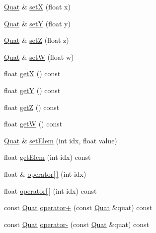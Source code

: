 \begin{DoxyCompactItemize}
\item 
\hyperlink{classVectormath_1_1Aos_1_1Quat}{Quat} \& \hyperlink{classVectormath_1_1Aos_1_1Quat_aaf8b9f42391c700a3fb3f3fc7a4279dd}{set\-X} (float x)
\item 
\hyperlink{classVectormath_1_1Aos_1_1Quat}{Quat} \& \hyperlink{classVectormath_1_1Aos_1_1Quat_a94831b10a0835a3520bf0c0dd05b22e4}{set\-Y} (float y)
\item 
\hyperlink{classVectormath_1_1Aos_1_1Quat}{Quat} \& \hyperlink{classVectormath_1_1Aos_1_1Quat_a7459f097a95f2b6452a9b92fcc7fcc2f}{set\-Z} (float z)
\item 
\hyperlink{classVectormath_1_1Aos_1_1Quat}{Quat} \& \hyperlink{classVectormath_1_1Aos_1_1Quat_a2c199fb1c797feb886666429486d6ea6}{set\-W} (float w)
\item 
float \hyperlink{classVectormath_1_1Aos_1_1Quat_aa83c97df393beb816c3b1ea8765ae91b}{get\-X} () const 
\item 
float \hyperlink{classVectormath_1_1Aos_1_1Quat_a68d167ff6d94e04da2958d786c0abd1c}{get\-Y} () const 
\item 
float \hyperlink{classVectormath_1_1Aos_1_1Quat_abc93cb2e4127c67facb3381993f0a5b3}{get\-Z} () const 
\item 
float \hyperlink{classVectormath_1_1Aos_1_1Quat_af3454e9af522029ab78c9194fdf596ec}{get\-W} () const 
\item 
\hyperlink{classVectormath_1_1Aos_1_1Quat}{Quat} \& \hyperlink{classVectormath_1_1Aos_1_1Quat_a6f1771cc66b41eb720c07c99ca0ade2b}{set\-Elem} (int idx, float value)
\item 
float \hyperlink{classVectormath_1_1Aos_1_1Quat_ac78d925ad28ec0b1603e78d4401ff130}{get\-Elem} (int idx) const 
\item 
float \& \hyperlink{classVectormath_1_1Aos_1_1Quat_a5eff7e127f055a218122e1d9b610af22}{operator\mbox{[}$\,$\mbox{]}} (int idx)
\item 
float \hyperlink{classVectormath_1_1Aos_1_1Quat_ae961280298e1e79b72746c896afef57a}{operator\mbox{[}$\,$\mbox{]}} (int idx) const 
\item 
const \hyperlink{classVectormath_1_1Aos_1_1Quat}{Quat} \hyperlink{classVectormath_1_1Aos_1_1Quat_af77154deb297f50456f0191eb04555f2}{operator+} (const \hyperlink{classVectormath_1_1Aos_1_1Quat}{Quat} \&quat) const 
\item 
const \hyperlink{classVectormath_1_1Aos_1_1Quat}{Quat} \hyperlink{classVectormath_1_1Aos_1_1Quat_a5dc40414292561084f7a013248b31c82}{operator-\/} (const \hyperlink{classVectormath_1_1Aos_1_1Quat}{Quat} \&quat) const 

\end{DoxyCompactItemize}
